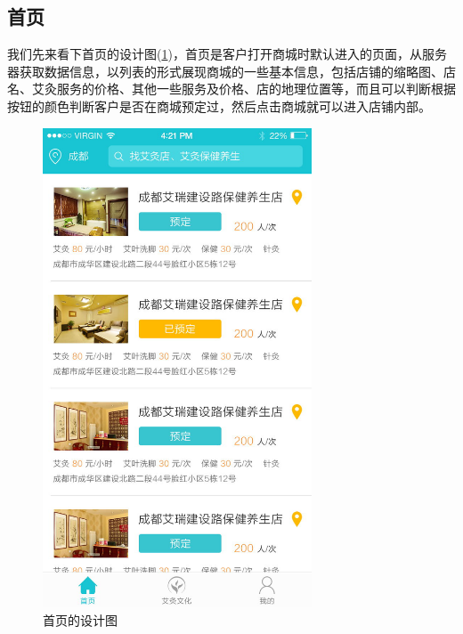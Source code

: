     \subsection{首页}
      \label{subsec:首页}
        我们先来看下首页的设计图(\ref{fig:home_dsn})，首页是客户打开商城时默认进入的页面，从服务器获取数据信息，以列表的形式展现商城的一些基本信息，包括店铺的缩略图、店名、艾灸服务的价格、其他一些服务及价格、店的地理位置等，而且可以判断根据按钮的颜色判断客户是否在商城预定过，然后点击商城就可以进入店铺内部。
        \begin{figure}[htbp]
          \centering
          \includegraphics[width=8cm]{./img/home_dsn.jpg}
          \caption{首页的设计图}
          \label{fig:home_dsn}
        \end{figure}

